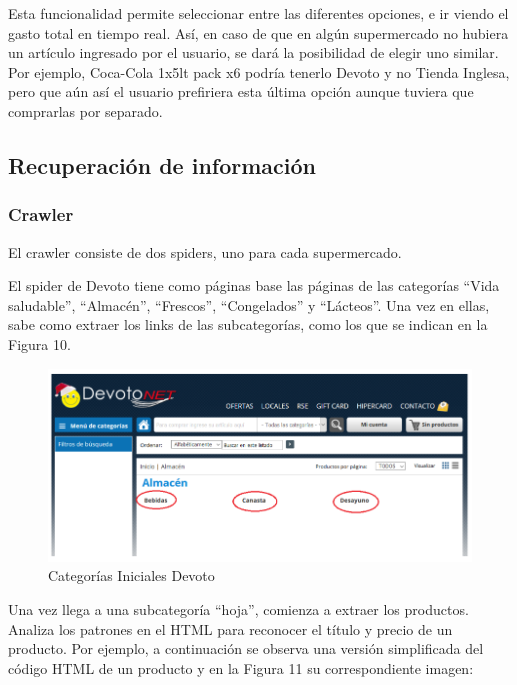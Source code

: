 \documentclass[12pt]{article} %
\begin{document}
Esta funcionalidad permite seleccionar entre las diferentes opciones, e ir viendo el gasto total en tiempo real. Así, en caso de que en algún supermercado no hubiera un artículo ingresado por el usuario, se dará la posibilidad de elegir uno similar. Por ejemplo, Coca-Cola 1x5lt pack x6 podría tenerlo Devoto y no Tienda Inglesa, pero que aún así el usuario prefiriera esta última opción aunque tuviera que comprarlas por separado.


\subsection{Recuperación de información}

\subsubsection{Crawler}

El crawler consiste de dos spiders, uno para cada supermercado.

El spider de Devoto \cite{Devoto} tiene como páginas base las páginas de las categorías “Vida saludable”, “Almacén”, “Frescos”, “Congelados” y “Lácteos”. Una vez en ellas, sabe como extraer los links de las subcategorías, como los que se indican en la Figura 10.

\begin{figure}[H]
\includegraphics[scale=.9]{pag_devoto}
\centering
\caption{Categorías Iniciales Devoto}
\end{figure}


Una vez llega a una subcategoría “hoja”, comienza a extraer los productos. Analiza los patrones en el HTML para reconocer el título y precio de un producto. Por ejemplo, a continuación se observa una versión simplificada del código HTML de un producto y en la Figura 11 su correspondiente imagen:
\end{document}
